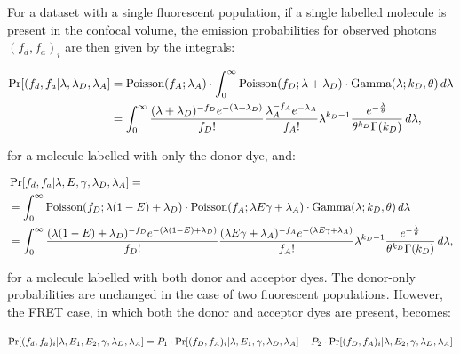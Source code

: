 For a dataset with a single fluorescent population, if a single labelled molecule is present in the confocal volume, the emission probabilities for observed photons $(f_d, f_a)_i$ are then given by the integrals:

\begin{align}
\footnotesize
\Pr[(f_d, f_a| \lambda, \lambda_{D}, \lambda_{A}] 
&= \text{Poisson}(f_A; \lambda_{A}) \cdot \int_0^{\infty} \text{Poisson}(f_D; \lambda + \lambda_{D})\cdot \text{Gamma}(\lambda; k_D, \theta) \, d\lambda \\
&= \int_0^{\infty} \frac{(\lambda + \lambda_{D})^{-f_D} e^{-(\lambda + \lambda_{D})}}{f_D!} \frac{\lambda_{A}^{-f_A} e^{-\lambda_{A}}}{f_A!} \lambda^{k_D-1} \frac{e^{-\frac{\lambda}{\theta}}}{\theta^{k_D}\Gamma(k_D)} \, d\lambda ,
\end{align} 

for a molecule labelled with only the donor dye, and:

\begin{align}
\footnotesize
&\Pr[f_d, f_a| \lambda, E, \gamma, \lambda_{D}, \lambda_{A}] =\\ 
&= \int_0^{\infty}\text{Poisson}(f_D; \lambda (1-E) + \lambda_{D})\cdot\text{Poisson}(f_A; \lambda E \gamma + \lambda_{A}) \cdot \text{Gamma}(\lambda; k_D, \theta) \, d\lambda \\
&= \int_0^{\infty}\frac{(\lambda (1-E)+\lambda_{D})^{-f_D}e^{-(\lambda(1-E)+\lambda_{D})}}{f_D!}\frac{(\lambda E \gamma + \lambda_{A})^{-f_A}e^{-(\lambda E \gamma+\lambda_{A})}}{f_A!}\lambda^{k_D-1}\frac{e^{-\frac{\lambda}{\theta}}}{\theta^{k_D}\Gamma(k_D)} \, d\lambda ,
\label{eq:FRET_single}
\end{align} 

for a molecule labelled with both donor and acceptor dyes.  The donor-only probabilities are unchanged in the case of two fluorescent populations. However, the FRET case, in which both the donor and acceptor dyes are present, becomes: 

\begin{equation}
\footnotesize
\Pr[(f_d, f_a)_i | \lambda, E_1, E_2, \gamma, \lambda_{D}, \lambda_{A}] = P_1 \cdot \Pr[(f_D, f_A)_i | \lambda, E_1, \gamma, \lambda_{D}, \lambda_{A}] + P_2 \cdot \Pr[(f_D, f_A)_i | \lambda, E_2, \gamma, \lambda_{D}, \lambda_{A}] 
\label{eq:FRET_multi}
\end{equation}

